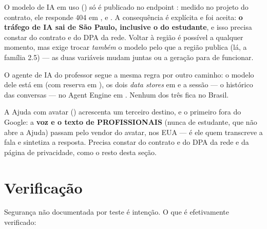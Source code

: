 \begin{atencao}
O modelo de IA em uso () só é publicado no endpoint
: medido no projeto do contrato, ele responde 404 em
,  e . A consequência é
explícita e foi aceita: \textbf{o tráfego de IA sai de São Paulo, inclusive o do
estudante}, e isso precisa constar do contrato e do DPA da rede. Voltar à região é
possível a qualquer momento, mas exige trocar \emph{também} o modelo pelo que a
região publica (lá, a família 2.5) --- as duas variáveis mudam juntas ou a
geração para de funcionar.

O agente de IA do professor segue a mesma regra por outro caminho: o modelo dele
está em  (com reserva em ), os dois \emph{data stores} em
 e a sessão --- o histórico das conversas --- no Agent Engine em
. Nenhum dos três fica no Brasil.

A Ajuda com avatar () acrescenta um terceiro destino, e o
primeiro fora do Google: a \textbf{voz e o texto de PROFISSIONAIS} (nunca de
estudante, que não abre a Ajuda) passam pelo vendor do avatar, nos EUA --- é ele
quem transcreve a fala e sintetiza a resposta. Precisa constar do contrato e do
DPA da rede e da página de privacidade, como o resto desta seção.
\end{atencao}

\section{Verificação}

Segurança não documentada por teste é intenção. O que é efetivamente verificado:

